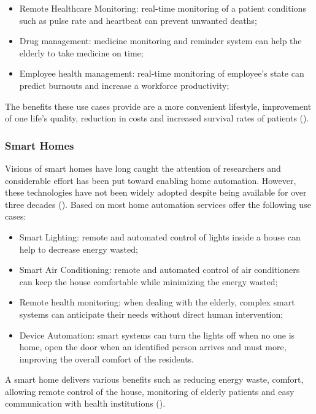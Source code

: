 \begin{itemize}
    \item Remote Healthcare Monitoring: real-time monitoring of a patient conditions such as pulse rate and heartbeat can prevent unwanted deaths;
    \item Drug management: medicine monitoring and reminder system can help the elderly to take medicine on time;
    \item Employee health management: real-time monitoring of employee's state can predict burnouts and increase a workforce productivity;
\end{itemize}

The benefits these use cases provide are a more convenient lifestyle, improvement of one life's quality, reduction in costs and increased survival rates of patients (\cite{iot-healthcare}).

\subsubsection{Smart Homes}
\label{subsubsec:stateofart:iot:areas:home}

Visions of smart homes have long caught the attention of researchers and considerable effort has been put toward enabling home automation. However, these technologies have not been widely adopted despite being available for over three decades (\cite{iot-smarthomes}).
Based on \cite{smarthome-review} most home automation services offer the following use cases:

\begin{itemize}
    \item Smart Lighting: remote and automated control of lights inside a house can help to decrease energy wasted;
    \item Smart Air Conditioning: remote and automated control of air conditioners can keep the house comfortable while minimizing the energy wasted;
    \item Remote health monitoring: when dealing with the elderly, complex smart systems can anticipate their needs without direct human intervention;
    \item Device Automation: smart systems can turn the lights off when no one is home, open the door when an identified person arrives and must more, improving the overall comfort of the residents.
\end{itemize}

A smart home delivers various benefits such as reducing energy waste, comfort, allowing remote control of the house, monitoring of elderly patients and easy communication with health institutions (\cite{smarthome-review}).

